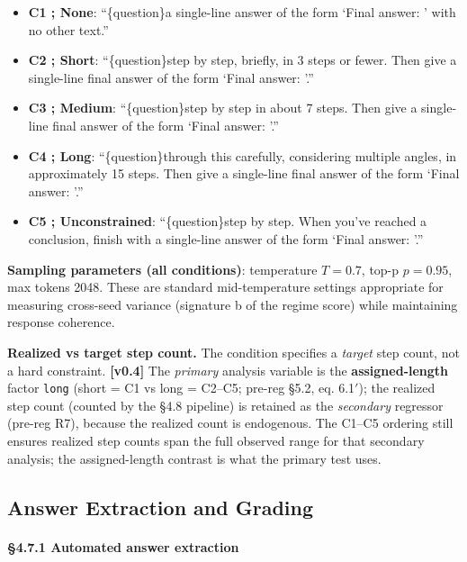 \documentclass{article}
\begin{document}
\begin{itemize}
\item
  \textbf{C1 ; None}: ``\{question\}a single-line answer of the form
  `Final answer: ' with no other text.''
\item
  \textbf{C2 ; Short}: ``\{question\}step by step, briefly, in 3 steps
  or fewer. Then give a single-line final answer of the form `Final
  answer: '.''
\item
  \textbf{C3 ; Medium}: ``\{question\}step by step in about 7 steps.
  Then give a single-line final answer of the form `Final answer: '.''
\item
  \textbf{C4 ; Long}: ``\{question\}through this carefully, considering
  multiple angles, in approximately 15 steps. Then give a single-line
  final answer of the form `Final answer: '.''
\item
  \textbf{C5 ; Unconstrained}: ``\{question\}step by step. When you've
  reached a conclusion, finish with a single-line answer of the form
  `Final answer: '.''
\end{itemize}

\textbf{Sampling parameters (all conditions)}: temperature \(T = 0.7\),
top-p \(p = 0.95\), max tokens 2048. These are standard mid-temperature
settings appropriate for measuring cross-seed variance (signature b of
the regime score) while maintaining response coherence.

\textbf{Realized vs target step count.} The condition specifies a
\emph{target} step count, not a hard constraint. \textbf{{[}v0.4{]}} The
\emph{primary} analysis variable is the \textbf{assigned-length} factor
\texttt{long} (short = C1 vs long = C2--C5; pre-reg \S{}5.2, eq. 6.1\ensuremath{\prime}); the
realized step count (counted by the \S{}4.8 pipeline) is retained as the
\emph{secondary} regressor (pre-reg R7), because the realized count is
endogenous. The C1--C5 ordering still ensures realized step counts span
the full observed range for that secondary analysis; the assigned-length
contrast is what the primary test uses.

\subsection{Answer Extraction and
Grading}\label{answer-extraction-and-grading}

\paragraph{\S{}4.7.1 Automated answer
extraction}\label{automated-answer-extraction}
\end{document}
